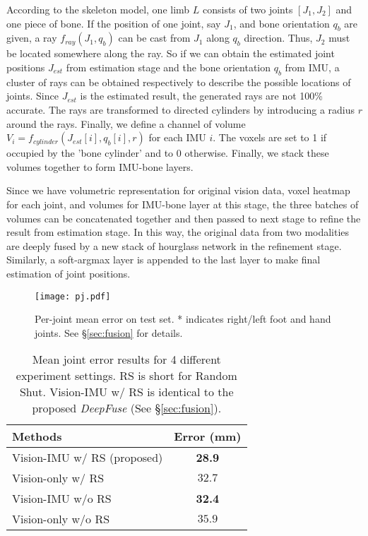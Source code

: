 \documentclass[10pt,twocolumn,letterpaper]{article}
\begin{document}
According to the skeleton model, one limb $L$ consists of two joints $[J_1,J_2]$ and one piece of bone. If the position of one joint, say $J_1$, and bone orientation $q_{b}$ are given, a ray $f_{ray}(J_1,q_{b})$ can be cast from $J_1$ along $q_{b}$ direction. Thus, $J_2$ must be located somewhere along the ray. So if we can obtain the estimated joint positions $J_{est}$ from estimation stage and the bone orientation $q_b$ from IMU, a cluster of rays can be obtained respectively to describe the possible locations of joints. Since $J_{est}$ is the estimated result, the generated rays are not 100\% accurate. The rays are transformed to directed cylinders by introducing a radius $r$ around the rays. Finally, we define a channel of volume $V_i=f_{cylinder}(J_{est}[i],q_b[i],r)$ for each IMU $i$. The voxels are set to 1 if occupied by the 'bone cylinder' and to 0 otherwise. Finally, we stack these volumes together to form IMU-bone layers.   

Since we have volumetric representation for original vision data, voxel heatmap for each joint, and volumes for IMU-bone layer at this stage, the three batches of volumes can be concatenated together and then passed to next stage to refine the result from estimation stage. In this way, the original data from two modalities are deeply fused by a new stack of hourglass network in the refinement stage. Similarly, a soft-argmax layer is appended to the last layer to make final estimation of joint positions. 



\begin{figure}
\begin{center}
\texttt{[image: pj.pdf]}
\end{center}
    \vspace{-0.5cm}
   \caption{Per-joint mean error on test set. * indicates right/left foot and hand joints. See \S\ref{sec:fusion} for details.}
\label{fig:pj}
\end{figure}
\begin{table}
\begin{center}
\begin{tabular}{|l|c|}
\hline
Methods &  Error (mm) \\
\hline\hline
Vision-IMU w/ RS (proposed)& \textbf{28.9} \\
Vision-only w/ RS  & $32.7$ \\
\hline
Vision-IMU w/o RS  & \textbf{32.4}\\
Vision-only w/o RS & $35.9$ \\
\hline
\end{tabular}
\end{center}
\vspace{-0.5cm}
\caption{Mean joint error results for 4 different experiment settings. RS is short for Random Shut. Vision-IMU w/ RS is identical to the proposed \emph{DeepFuse} (See \S\ref{sec:fusion}). }
\label{tab:fs}
\vspace*{-14pt}
\end{table}
\end{document}
